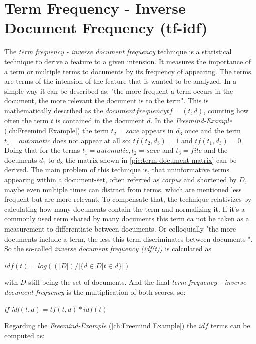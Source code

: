 \section{Term Frequency - Inverse Document Frequency (tf-idf)}
\label{sec:tf-idf}
The \emph{term frequency - inverse document frequency} technique is a statistical technique to derive a feature to a given intension. It measures the importance of a term or multiple terms to documents by its frequency of appearing. The terms are terms of the intension of the feature that is wanted to be analyzed. In a simple way it can be described as: "the more frequent a term occurs in the document, the more relevant the document is to the term". \newline
This is mathematically described as the $document frequency tf=(t,d)$, counting how often the term $t$ is contained in the document $d$.
In the \textit{Freemind-Example} (\autoref{ch:Freemind Example}) the term $t_2 = save$ appears in $d_3$ once and the term $t_1 = automatic$ does not appear at all so: $tf(t_2,d_3) = 1$ and $tf(t_1,d_3)=0$. \newline
Doing that for the terms $t_1 = automatic, t_2 = save$ and $t_3 = file$ and the documents $d_1$ to $d_8$ the matrix shown in \autoref{pic:term-document-matrix} can be derived.
The main problem of this technique is, that uninformative terms appearing within a document-set, often referred as \emph{corpus} and shortened by $D$, maybe even multiple times can distract from terms, which are mentioned less frequent but are more relevant. To compensate that, the technique relativizes by calculating how many documents contain the term and normalizing it. If it's a commonly used term shared by many documents this term ca not be taken as a measurement to differentiate between documents. Or colloquially "the more documents include a term, the less this term discriminates between documents ". \newline
So the so-called \emph{inverse document frequency (idf(t))} is calculated as
\begin{center} $idf(t) = log((|D|)/|\{ d \in D | t \in d \}|)$  \end{center}
with $D$ still being the set of documents. And the final \emph{term frequency - inverse document frequency} is the multiplication of both scores, so:
\begin{center} \emph{tf-idf}$(t,d) = tf(t,d) * idf(t)$\end{center}
Regarding the \textit{Freemind-Example} (\autoref{ch:Freemind Example}) the $idf$ terms can be computed as:

